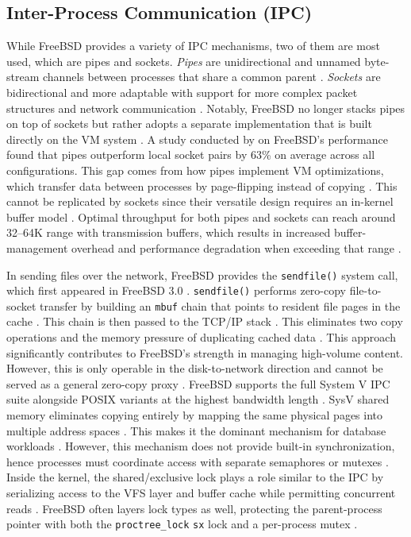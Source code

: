 \subsection{Inter-Process Communication (IPC)} \label{ipc} %

While FreeBSD provides a variety of IPC mechanisms, two of them are most used, which are pipes and sockets. \textit{Pipes}
are unidirectional and unnamed byte-stream channels between processes that share a common parent \parencite{bellthomas2020}.
\textit{Sockets} are bidirectional and more adaptable with support for more complex packet structures and network
communication \parencite{bellthomas2020}. Notably, FreeBSD no longer stacks pipes on top of sockets but rather adopts
a separate implementation that is built directly on the VM system \parencite{bellthomas2020}. A study conducted by
\textcite{bellthomas2020} on FreeBSD's performance found that pipes outperform local socket pairs by 63\% on average
across all configurations. This gap comes from how pipes implement VM optimizations, which transfer data between processes
by page-flipping instead of copying \parencite{bellthomas2020}. This cannot be replicated by sockets since their versatile
design requires an in-kernel buffer model \parencite{bellthomas2020}. Optimal throughput for both pipes and sockets can
reach around 32--64K range with transmission buffers, which results in increased buffer-management overhead and performance
degradation when exceeding that range \parencite{bellthomas2020}.

In sending files over the network, FreeBSD provides the \texttt{sendfile()} system call, which first appeared in FreeBSD 3.0
\parencite{freebsd_sendfile}. \texttt{sendfile()} performs zero-copy file-to-socket transfer by building an \texttt{mbuf}
chain that points to resident file pages in the cache \parencite{freebsd_sendfile}. This chain is then passed to the TCP/IP stack
\parencite{freebsd_sendfile}. This eliminates two copy operations and the memory pressure of duplicating cached data
\parencite{freebsd_sendfile}. This approach significantly contributes to FreeBSD's strength in managing high-volume content.
However, this is only operable in the disk-to-network direction and cannot be served as a general zero-copy proxy
\parencite{freebsd_sendfile}. FreeBSD supports the full System V IPC suite alongside POSIX variants at the highest
bandwidth length \parencite{tyk_sysvipc}. SysV shared memory eliminates copying entirely by mapping the same physical pages
into multiple address spaces \parencite{tyk_sysvipc}.  This makes it the dominant mechanism for database
workloads \parencite{tyk_sysvipc}. However, this mechanism does not provide built-in synchronization, hence processes
must coordinate access with separate semaphores or mutexes \parencite{tyk_sysvipc}. Inside the kernel, the shared/exclusive
lock plays a role similar to the IPC by serializing access to the VFS layer and buffer cache while permitting concurrent reads
\parencite{freebsd_smp_lock_strategies}. FreeBSD often layers lock types as well, protecting the parent-process pointer with both the
\texttt{proctree\_lock} \texttt{sx} lock and a per-process mutex \parencite{freebsd_smp_lock_strategies}.

